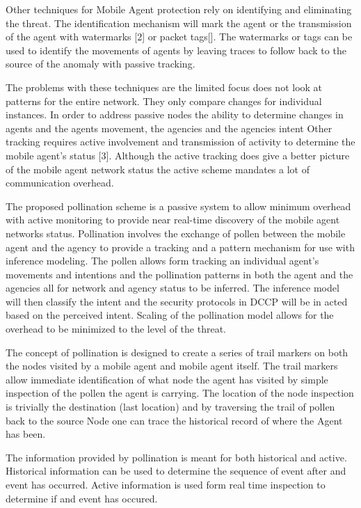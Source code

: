 \documentclass{acm_proc_article-sp}
\begin{document}
Other techniques for Mobile Agent protection rely on identifying and eliminating the threat. The identification mechanism will mark the agent or the transmission of the agent with watermarks [2] or packet tags[]. The watermarks or tags can be used to identify the movements of agents by leaving traces to follow back to the source of the anomaly with passive tracking. 

The problems with these techniques are the limited focus does not look at patterns for the entire network. They only compare changes for individual instances. In order to address passive nodes the ability to determine changes in agents and the agents movement, the agencies and the agencies intent
Other tracking requires active involvement and transmission of activity to determine the mobile agent's status [3]. Although the active tracking does give a better picture of the mobile agent network status the active scheme mandates a lot of communication overhead.

The proposed pollination scheme is a passive system to allow minimum overhead with active monitoring to provide near real-time discovery of the mobile agent networks status. Pollination involves the exchange of pollen between the mobile agent and the agency to provide a tracking and a pattern mechanism for use with inference modeling. The pollen allows form tracking an individual agent's movements and intentions and the pollination patterns in both the agent and the agencies all for network and agency status to be inferred. The inference model will then classify the intent and the security protocols in DCCP will be in acted based on the perceived intent. Scaling of the pollination model allows for the overhead to be minimized to the level of the threat. 

The concept of pollination is designed to create a series of trail markers on both the nodes visited by a mobile agent and mobile agent itself. The trail markers allow immediate identification of what node the agent has visited by simple inspection of the pollen the agent is carrying. The location of the node inspection is trivially the destination (last location) and by traversing the trail of pollen back to the source Node one can trace the historical record of where the Agent has been.

The information provided by pollination is meant for both historical and active. Historical information can be used to determine the sequence of event after and event has occurred. Active information is used form real time inspection to determine if and event has occured.
\end{document}
